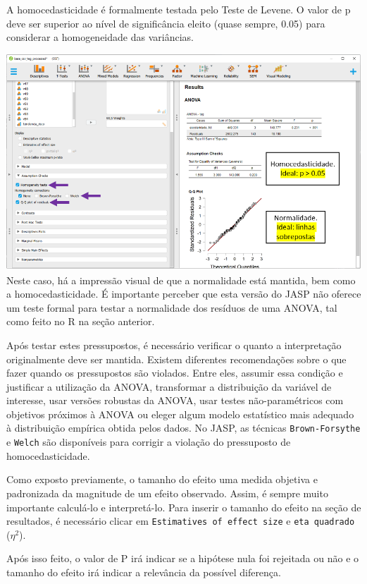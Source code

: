 \documentclass[
]{book}
\begin{document}
A homocedasticidade é formalmente testada pelo Teste de Levene. O valor de p deve ser superior ao nível de significância eleito (quase sempre, 0.05) para considerar a homogeneidade das variâncias.

\includegraphics{./img/cap_anova_assumptions2.png}
Neste caso, há a impressão visual de que a normalidade está mantida, bem como a homocedasticidade. É importante perceber que esta versão do JASP não oferece um teste formal para testar a normalidade dos resíduos de uma ANOVA, tal como feito no R na seção anterior.

Após testar estes pressupostos, é necessário verificar o quanto a interpretação originalmente deve ser mantida. Existem diferentes recomendações sobre o que fazer quando os pressupostos são violados. Entre eles, assumir essa condição e justificar a utilização da ANOVA, transformar a distribuição da variável de interesse, usar versões robustas da ANOVA, usar testes não-paramétricos com objetivos próximos à ANOVA ou eleger algum modelo estatístico mais adequado à distribuição empírica obtida pelos dados. No JASP, as técnicas \texttt{Brown-Forsythe} e \texttt{Welch} são disponíveis para corrigir a violação do pressuposto de homocedasticidade.

Como exposto previamente, o tamanho do efeito uma medida objetiva e padronizada da magnitude de um efeito observado. Assim, é sempre muito importante calculá-lo e interpretá-lo. Para inserir o tamanho do efeito na seção de resultados, é necessário clicar em \texttt{Estimatives\ of\ effect\ size} e \texttt{eta\ quadrado} (\(\eta^2\)).

Após isso feito, o valor de P irá indicar se a hipótese nula foi rejeitada ou não e o tamanho do efeito irá indicar a relevância da possível diferença.
\end{document}
